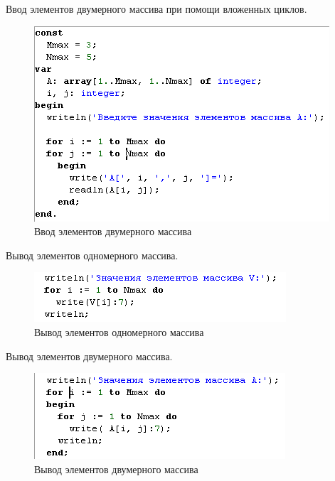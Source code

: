 \documentclass{beamer}
\begin{document}
\begin{frame}
Ввод элементов двумерного массива при помощи вложенных циклов.
\begin{figure}[h]
\centering
\includegraphics[scale=1.0]{images/array_input_code_two.png}
\caption{Ввод элементов двумерного массива}
\label{pic-input-two-index-code}
\end{figure}
\end{frame}

\begin{frame}
Вывод элементов одномерного массива.
\begin{figure}[h]
\centering
\includegraphics[scale=1.0]{images/array_output_code_one.png}
\caption{Вывод элементов одномерного массива}
\label{pic-output-code-one}
\end{figure}

Вывод элементов двумерного массива.
\begin{figure}[h]
\centering
\includegraphics[scale=1.0]{images/array_output_code.png}
\caption{Вывод элементов двумерного массива}
\label{pic-output-code-two}
\end{figure}
\end{frame}
\end{document}
